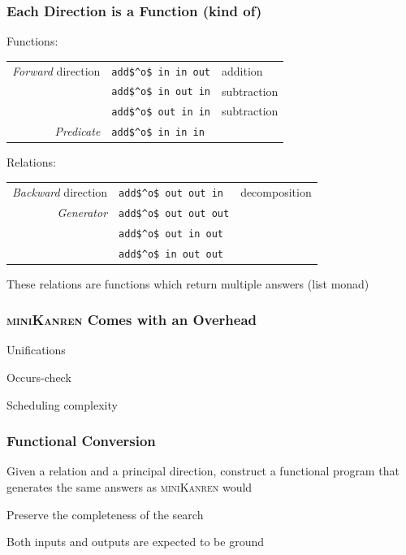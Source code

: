 \documentclass[xcolor=table]{beamer}
\newcommand{\mk}{\textsc{miniKanren}\xspace}
\begin{document}
\begin{frame}[fragile]
  \frametitle{Each Direction is a Function \pause (kind of)}
Functions:
\begin{center}
\begin{tabular}{rll}
  \emph{Forward} direction  & \lstinline|add$^o$ in in out|   & addition      \\
                            & \lstinline|add$^o$ in out in|   & subtraction   \\
                            & \lstinline|add$^o$ out in in|   & subtraction   \\
  \emph{Predicate}          & \lstinline|add$^o$ in in in|    &
\end{tabular}
\end{center}

\vfill

Relations:
\begin{center}
\begin{tabular}{rll}
  \emph{Backward} direction & \lstinline|add$^o$ out out in|  & decomposition \\
  \emph{Generator}          & \lstinline|add$^o$ out out out| &               \\
                            & \lstinline|add$^o$ out in out|  &               \\
                            & \lstinline|add$^o$ in out out|  &
\end{tabular}
\end{center}
These relations are functions which return multiple answers (list monad)
\end{frame}

\begin{frame}[fragile]
  \frametitle{\mk Comes with an Overhead}
  \begin{center}
    Unifications
  \end{center}

  \begin{center}
    Occurs-check
  \end{center}

  \begin{center}
    Scheduling complexity
  \end{center}
\end{frame}

\begin{frame}[fragile]
  \frametitle{Functional Conversion}
\begin{center}
  Given a relation and a principal direction, construct a functional program that generates the same answers as \mk would
\end{center}

\vfill

\begin{center}
  Preserve the completeness of the search
\end{center}

\vfill

\begin{center}
Both inputs and outputs are expected to be ground
\end{center}
\end{frame}
\end{document}
